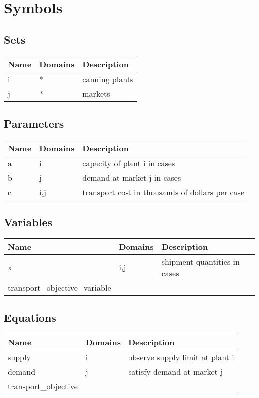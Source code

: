\documentclass[11pt]{article}
\begin{document}
\section*{Symbols}


\subsection*{Sets}
\begin{tabularx}{\textwidth}{| l | l | X |}
\hline
\textbf{Name} & \textbf{Domains} & \textbf{Description}\\
\hline
\endhead

i & * & canning plants\\
j & * & markets\\
\hline
\end{tabularx}
\subsection*{Parameters}
\begin{tabularx}{\textwidth}{| l | l | X |}
\hline
\textbf{Name} & \textbf{Domains} & \textbf{Description}\\
\hline
\endhead

a & i & capacity of plant i in cases\\
b & j & demand at market j in cases\\
c & i,j & transport cost in thousands of dollars per case\\
\hline
\end{tabularx}
\subsection*{Variables}
\begin{tabularx}{\textwidth}{| l | l | X |}
\hline
\textbf{Name} & \textbf{Domains} & \textbf{Description}\\
\hline
\endhead

x & i,j & shipment quantities in cases\\
transport\_objective\_variable &  & \\
\hline
\end{tabularx}
\subsection*{Equations}
\begin{tabularx}{\textwidth}{| l | l | X |}
\hline
\textbf{Name} & \textbf{Domains} & \textbf{Description}\\
\hline
\endhead

supply & i & observe supply limit at plant i\\
demand & j & satisfy demand at market j\\
transport\_objective &  & \\
\hline
\end{tabularx}
\end{document}
